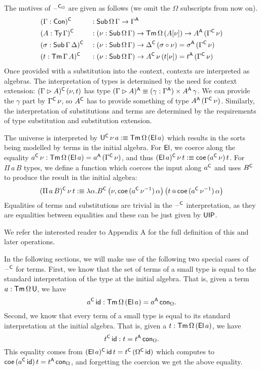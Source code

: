 \documentclass[acmsmall,screen]{acmart}
\begin{document}
The motives of $\mathord{\hspace{1pt}\text{--}\hspace{1pt}}^{\mathsf{C}_\Omega}$ are given as follows (we omit the
$\Omega$ subscripts from now on).
\begin{alignat*}{5}
  & (\Gamma:\mathsf{Con})^{\mathsf{C}} && : \mathsf{Sub}\,\Omega\,\Gamma\rightarrow\Gamma^{\mathsf{A}} \\
  & (A:\mathsf{Ty}\,\Gamma)^{\mathsf{C}} && : (\nu:\mathsf{Sub}\,\Omega\,\Gamma)\rightarrow\mathsf{Tm}\,\Omega\,(A[\nu])\rightarrow A^{\mathsf{A}}\,(\Gamma^{\mathsf{C}}\,\nu) \\
  & (\sigma:\mathsf{Sub}\,\Gamma\,\Delta)^{\mathsf{C}} && : (\nu:\mathsf{Sub}\,\Omega\,\Gamma)\rightarrow \Delta^{\mathsf{C}}\,(\sigma\circ\nu)=\sigma^{\mathsf{A}}\,(\Gamma^{\mathsf{C}}\,\nu) \\
  & (t:\mathsf{Tm}\,\Gamma\,A)^{\mathsf{C}} && : (\nu:\mathsf{Sub}\,\Omega\,\Gamma)\rightarrow A^{\mathsf{C}}\,\nu\,(t[\nu])=t^{\mathsf{A}}\,(\Gamma^{\mathsf{C}}\,\nu)
\end{alignat*}
Once provided with a substitution into the context, contexts are
interpreted as algebras. The interpretation of types is determined by
the need for context extension: $(\Gamma\rhd A)^{\mathsf{C}}\,(\nu,t)$ has type
$(\Gamma\rhd A)^{\mathsf{A}}\equiv(\gamma:\Gamma^{\mathsf{A}})\times A^{\mathsf{A}}\,\gamma$. We can
provide the $\gamma$ part by $\Gamma^{\mathsf{C}}\,\nu$, so $A^{\mathsf{C}}$ has to
provide something of type $A^{\mathsf{A}}\,(\Gamma^{\mathsf{C}}\,\nu)$. Similarly, the
interpretation of substitutions and terms are determined by the
requirements of type substitution and substitution extension.

The universe is interpreted by $\mathsf{U}^{\mathsf{C}}\,\nu\,a :\equiv
\mathsf{Tm}\,\Omega\,(\mathsf{El}\,a)$ which results in the sorts being modelled by
terms in the initial algebra. For $\mathsf{El}$, we coerce along the equality
$a^{\mathsf{C}}\,\nu : \mathsf{Tm}\,\Omega\,(\mathsf{El}\,a) = a^{\mathsf{A}}\,(\Gamma^{\mathsf{C}}\,\nu)$, and thus
$(\mathsf{El}\,a)^{\mathsf{C}}\,\nu\,t :\equiv \mathsf{coe}\,(a^{\mathsf{C}}\,\nu)\,t$. For $\Pi\,a\,B$
types, we define a function which coerces the input along $a^{\mathsf{C}}$ and
uses $B^{\mathsf{C}}$ to produce the result in the initial algebra:
\[
(\Pi\,a\,B)^{\mathsf{C}}\,\nu\,t :\equiv \lambda\alpha.B^{\mathsf{C}}\,\big(\nu,\mathsf{coe}\,({a^{\mathsf{C}}\,\nu^{-1}})\,\alpha\big)\,\big(t\mathop{{\scriptstyle @}} \mathsf{coe}\,({a^{\mathsf{C}}\,\nu^{-1}})\,\alpha\big)
\]
Equalities of terms and substitutions are trivial in the $\mathord{\hspace{1pt}\text{--}\hspace{1pt}}^{\mathsf{C}}$
interpretation, as they are equalities between equalities and these
can be just given by $\mathsf{UIP}$.

We refer the interested reader to Appendix A for the full
definition of this and later operations.

In the following sections, we will make use of the following two
special cases of $\mathord{\hspace{1pt}\text{--}\hspace{1pt}}^{\mathsf{C}}$ for terms. First, we know that the set of
terms of a small type is equal to the standard interpretation of the
type at the initial algebra. That is, given a term
$a:\mathsf{Tm}\,\Omega\,\mathsf{U}$, we have
\[
a^{\mathsf{C}}\,\mathsf{id} : \mathsf{Tm}\,\Omega\,(\mathsf{El}\,a) = a^{\mathsf{A}}\,\mathsf{con}_\Omega.
\]
Second, we know that every term of a small type is equal to its
standard interpretation at the initial algebra. That is, given a
$t:\mathsf{Tm}\,\Omega\,(\mathsf{El}\,a)$, we have
\[
t^{\mathsf{C}}\,\mathsf{id} : t = t^{\mathsf{A}}\,\mathsf{con}_\Omega.
\]
This equality comes from $(\mathsf{El}\,a)^{\mathsf{C}}\,\mathsf{id}\,t =
t^{\mathsf{C}}\,(\Omega^{\mathsf{C}}\,\mathsf{id})$ which computes to $\mathsf{coe}\,(a^{\mathsf{C}}\,\mathsf{id})\,t =
t^{\mathsf{A}}\,\mathsf{con}_\Omega$, and forgetting the coercion we get the above
equality.
\end{document}
